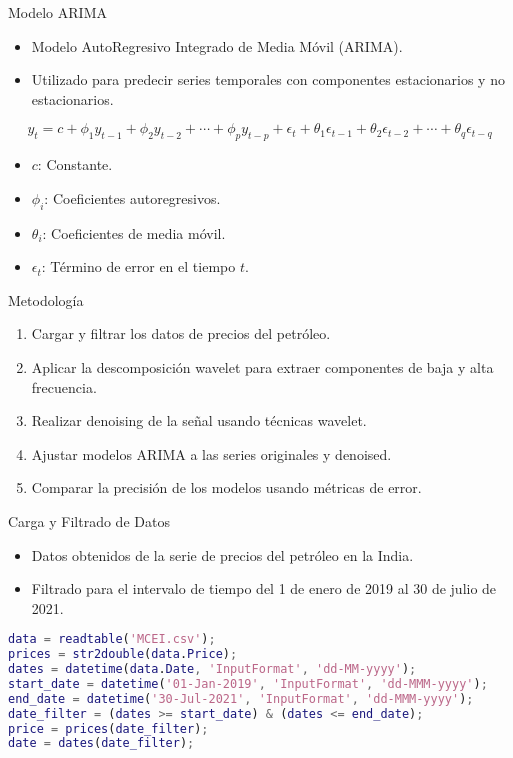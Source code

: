\documentclass{beamer}
\begin{document}
\begin{frame}{Modelo ARIMA}
\begin{itemize}
    \item Modelo AutoRegresivo Integrado de Media Móvil (ARIMA).
    \item Utilizado para predecir series temporales con componentes estacionarios y no estacionarios.
\end{itemize}
\begin{equation}
    y_t = c + \phi_1 y_{t-1} + \phi_2 y_{t-2} + \cdots + \phi_p y_{t-p} + \epsilon_t + \theta_1 \epsilon_{t-1} + \theta_2 \epsilon_{t-2} + \cdots + \theta_q \epsilon_{t-q}
\end{equation}
\begin{itemize}
    \item \(c\): Constante.
    \item \(\phi_i\): Coeficientes autoregresivos.
    \item \(\theta_i\): Coeficientes de media móvil.
    \item \(\epsilon_t\): Término de error en el tiempo \(t\).
\end{itemize}
\end{frame}

\begin{frame}{Metodología}
\begin{enumerate}
    \item Cargar y filtrar los datos de precios del petróleo.
    \item Aplicar la descomposición wavelet para extraer componentes de baja y alta frecuencia.
    \item Realizar denoising de la señal usando técnicas wavelet.
    \item Ajustar modelos ARIMA a las series originales y denoised.
    \item Comparar la precisión de los modelos usando métricas de error.
\end{enumerate}
\end{frame}

\begin{frame}{Carga y Filtrado de Datos}
\begin{itemize}
    \item Datos obtenidos de la serie de precios del petróleo en la India.
    \item Filtrado para el intervalo de tiempo del 1 de enero de 2019 al 30 de julio de 2021.
\end{itemize}
\begin{lstlisting}[language=Matlab]
data = readtable('MCEI.csv');
prices = str2double(data.Price);
dates = datetime(data.Date, 'InputFormat', 'dd-MM-yyyy');
start_date = datetime('01-Jan-2019', 'InputFormat', 'dd-MMM-yyyy');
end_date = datetime('30-Jul-2021', 'InputFormat', 'dd-MMM-yyyy');
date_filter = (dates >= start_date) & (dates <= end_date);
price = prices(date_filter);
date = dates(date_filter);
\end{lstlisting}
\end{frame}
\end{document}
